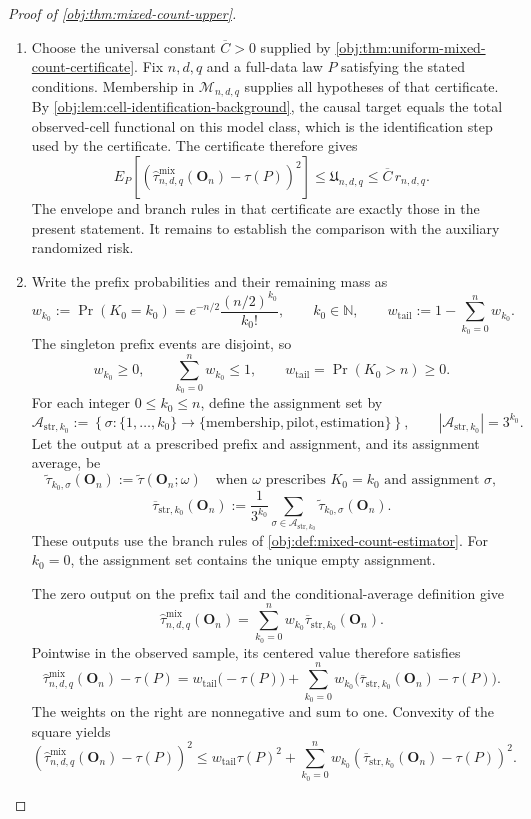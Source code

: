 \begin{proof}[Proof of \cref{obj:thm:mixed-count-upper}]
\begin{enumerate}
\item Choose the universal constant \(\overline C>0\) supplied by
\cref{obj:thm:uniform-mixed-count-certificate}. Fix \(n,d,q\) and a full-data law \(P\) satisfying the stated conditions. Membership in \(\mathcal M_{n,d,q}\) supplies all hypotheses of that certificate.
By \cref{obj:lem:cell-identification-background}, the causal target equals the total observed-cell functional on this model class, which is the identification step used by the certificate. The certificate therefore gives
\[
E_P\!\left[
\left(
\widehat\tau^{\mathrm{mix}}_{n,d,q}(\mathbf O_n)-\tau(P)
\right)^2
\right]
\le \mathfrak U_{n,d,q}
\le \overline C\,r_{n,d,q}.
\]
The envelope and branch rules in that certificate are exactly those in the present statement. It remains to establish the comparison with the auxiliary randomized risk.

\item Write the prefix probabilities and their remaining mass as
\[
w_{k_0}:=\Pr(K_0=k_0)
=e^{-n/2}\frac{(n/2)^{k_0}}{k_0!},
\qquad k_0\in\mathbb N,
\qquad
w_{\mathrm{tail}}:=1-\sum_{k_0=0}^{n}w_{k_0}.
\]
The singleton prefix events are disjoint, so
\[
w_{k_0}\ge0,
\qquad
\sum_{k_0=0}^{n}w_{k_0}\le1,
\qquad
w_{\mathrm{tail}}=\Pr(K_0>n)\ge0.
\]
For each integer \(0\le k_0\le n\), define the assignment set by
\[
\mathcal A_{\mathrm{str},k_0}
:=
\left\{
\sigma:\{1,\ldots,k_0\}
\longrightarrow
\{\mathrm{membership},\mathrm{pilot},\mathrm{estimation}\}
\right\},
\qquad
|\mathcal A_{\mathrm{str},k_0}|=3^{k_0}.
\]
Let the output at a prescribed prefix and assignment, and its assignment average, be
\[
\widetilde\tau_{k_0,\sigma}(\mathbf O_n)
:=
\widetilde\tau(\mathbf O_n;\omega)
\quad\text{when }\omega\text{ prescribes }K_0=k_0
\text{ and assignment }\sigma,
\]
\[
\overline\tau_{\mathrm{str},k_0}(\mathbf O_n)
:=
\frac{1}{3^{k_0}}
\sum_{\sigma\in\mathcal A_{\mathrm{str},k_0}}
\widetilde\tau_{k_0,\sigma}(\mathbf O_n).
\]
These outputs use the branch rules of
\cref{obj:def:mixed-count-estimator}. For \(k_0=0\), the assignment set contains the unique empty assignment.

The zero output on the prefix tail and the conditional-average definition give
\[
\widehat\tau^{\mathrm{mix}}_{n,d,q}(\mathbf O_n)
=
\sum_{k_0=0}^{n}
w_{k_0}\overline\tau_{\mathrm{str},k_0}(\mathbf O_n).
\]
Pointwise in the observed sample, its centered value therefore satisfies
\[
\widehat\tau^{\mathrm{mix}}_{n,d,q}(\mathbf O_n)-\tau(P)
=
w_{\mathrm{tail}}\bigl(-\tau(P)\bigr)
+
\sum_{k_0=0}^{n}
w_{k_0}
\bigl(\overline\tau_{\mathrm{str},k_0}(\mathbf O_n)-\tau(P)\bigr).
\]
The weights on the right are nonnegative and sum to one. Convexity of the square yields
\[
\left(
\widehat\tau^{\mathrm{mix}}_{n,d,q}(\mathbf O_n)-\tau(P)
\right)^2
\le
w_{\mathrm{tail}}\tau(P)^2
+
\sum_{k_0=0}^{n}
w_{k_0}
\left(
\overline\tau_{\mathrm{str},k_0}(\mathbf O_n)-\tau(P)
\right)^2.
\]


\end{enumerate}
\end{proof}

